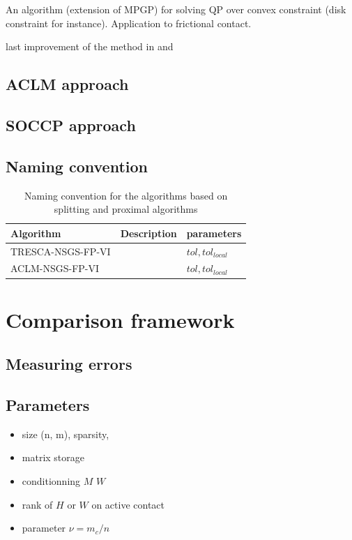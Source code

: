 \cite{Dostal.Kozubek_MP2012} An algorithm (extension of MPGP) for solving QP over convex constraint (disk constraint for instance). Application to frictional contact. 


\cite{Dostal.Kucera_SIOPT2010} last improvement of the method in \cite{Dostal.Kozubek_MP2012} and \cite{Kucera_SIOPT2008}




\subsection{ACLM approach}

\subsection{SOCCP approach}


\subsection{Naming convention}

\begin{table}
  \centering
  \begin{tabular}{|l|p{}|l|}
    \hline
    { Algorithm}
    & Description 
    & parameters\\
    \hline
    \sf TRESCA-NSGS-FP-VI
    & 
    & $tol, tol_{local}$\\
    \hline
    \sf ACLM-NSGS-FP-VI
    & 
    & $tol, tol_{local}$\\
    \hline
    \hline
  \end{tabular}
  \caption{Naming convention for the algorithms based on splitting and proximal algorithms}
  \label{tab:PSOR-PPA-algos}
\end{table}


\section{Comparison framework}
\label{sec:numericalcomparisons}
\subsection{Measuring errors}
\label{Sec:MeasuringErrors}

\subsection{Parameters}

\begin{itemize}
\item size (n, m), sparsity,
\item matrix storage
\item conditionning $M$ $W$
\item rank of $H$ or $W$ on active contact
\item parameter $\nu = m_c/n$
\end{itemize}

